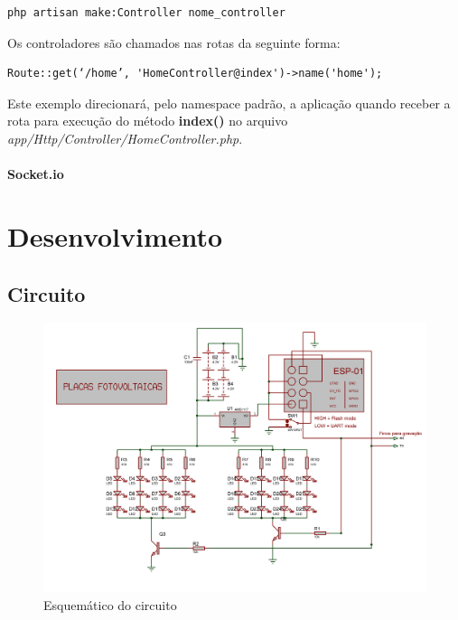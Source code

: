 \documentclass[
12pt,				%
openany,			%
twoside,			%
a4paper,			%
english,			%
french,				%
spanish,			%
brazil,				%
]{abntex2}
\begin{document}
\begin{lstlisting}[style=bash,caption={Criando um controller}]
    php artisan make:Controller nome_controller
\end{lstlisting}

Os controladores são chamados nas rotas da seguinte forma:

\begin{lstlisting}[style=php,caption={Prefixos de caminho}]
    Route::get(‘/home’, 'HomeController@index')->name('home'); 
\end{lstlisting}

Este exemplo direcionará, pelo namespace padrão, a aplicação quando receber a rota para execução do método \textbf{index()} no arquivo \textit{app/Http/Controller/HomeController.php}.

\subsection{Socket.io}

\part{Desenvolvimento}
\chapter{Circuito}
\begin{figure}[ht!]
    \includegraphics[width=450pt]{images/circuit.png}
    \caption{Esquemático do circuito}
\end{figure}
\end{document}

